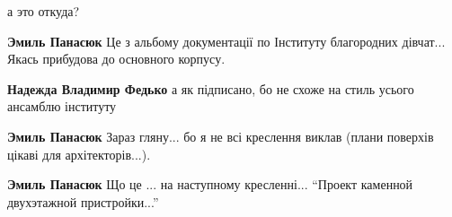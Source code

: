  
 
 
 
 

а это откуда?

\textbf{Эмиль Панасюк} Це з альбому документації по Інституту благородних дівчат... Якась прибудова до основного корпусу.

\textbf{Надежда Владимир Федько} а як підписано, бо не схоже на стиль усього ансамблю інституту

\textbf{Эмиль Панасюк} Зараз гляну... бо я не всі креслення виклав (плани поверхів цікаві для архітекторів...).

\textbf{Эмиль Панасюк} Що це ... на наступному кресленні... \enquote{Проект каменной двухэтажной пристройки...}
